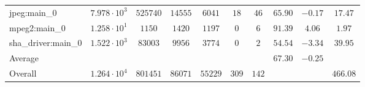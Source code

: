 \begin{tabular}{|l|c|c|c|c|c|c|c|c|c|}
jpeg:main\_0            & $ 7.978 \cdot 10^{3} $ & $ 525740 $ & $ 14555 $ & $ 6041  $ & $ 18  $ & $ 46  $ & $ 65.90       $ & $ -0.17   $ & $ 17.47   $ \\
mpeg2:main\_0           & $ 1.258 \cdot 10^{1} $ & $ 1150   $ & $ 1420  $ & $ 1197  $ & $ 0   $ & $ 6   $ & $ 91.39       $ & $ 4.06    $ & $ 1.97    $ \\
sha\_driver:main\_0     & $ 1.522 \cdot 10^{3} $ & $ 83003  $ & $ 9956  $ & $ 3774  $ & $ 0   $ & $ 2   $ & $ 54.54       $ & $ -3.34   $ & $ 39.95   $ \\
\hline
Average                 & $                    $ & $        $ & $       $ & $       $ & $     $ & $     $ & $ 67.30       $ & $ -0.25   $ & $         $ \\
\hline
Overall                 & $ 1.264 \cdot 10^{4} $ & $ 801451 $ & $ 86071 $ & $ 55229 $ & $ 309 $ & $ 142 $ & $             $ & $         $ & $ 466.08  $ \\
\hline
\end{tabular}
